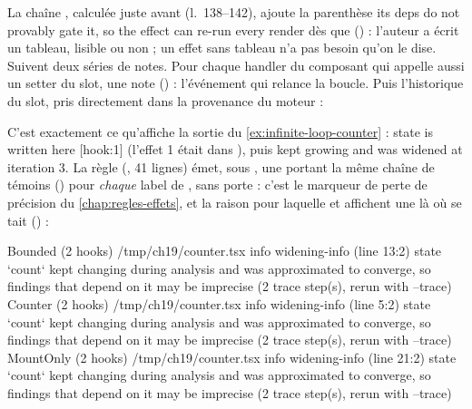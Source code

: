 
La chaîne , calculée juste avant (l.~138--142), ajoute la parenthèse \og its deps do not provably gate it, so the effect can re-run every render\fg{} dès que  () : l'auteur a écrit un tableau, lisible ou non ; un effet sans tableau n'a pas besoin qu'on le dise. Suivent deux séries de notes. Pour chaque handler du composant qui appelle aussi un setter du slot, une note  () : l'événement qui relance la boucle. Puis l'historique du slot, pris directement dans la provenance du moteur :


C'est exactement ce qu'affiche la sortie du \cref{ex:infinite-loop-counter} : \og state  is written here [hook:1]\fg{} (l'effet 1 était dans ), puis \og kept growing and was widened at iteration 3\fg. La règle  (, 41 lignes) émet, sous , une \Info{} portant la même chaîne de témoins () pour \emph{chaque} label de , sans porte : c'est le marqueur de perte de précision du \cref{chap:regles-effets}, et la raison pour laquelle  et  affichent une \Info{} là où  se tait () :
\begin{sortie}
  Bounded  (2 hooks)  /tmp/ch19/counter.tsx
    info   widening-info  (line 13:2)  state `count` kept changing during analysis and was approximated to converge, so findings that depend on it may be imprecise
       (2 trace step(s), rerun with --trace)
  Counter  (2 hooks)  /tmp/ch19/counter.tsx
    info   widening-info  (line 5:2)  state `count` kept changing during analysis and was approximated to converge, so findings that depend on it may be imprecise
       (2 trace step(s), rerun with --trace)
  MountOnly  (2 hooks)  /tmp/ch19/counter.tsx
    info   widening-info  (line 21:2)  state `count` kept changing during analysis and was approximated to converge, so findings that depend on it may be imprecise
       (2 trace step(s), rerun with --trace)
\end{sortie}

